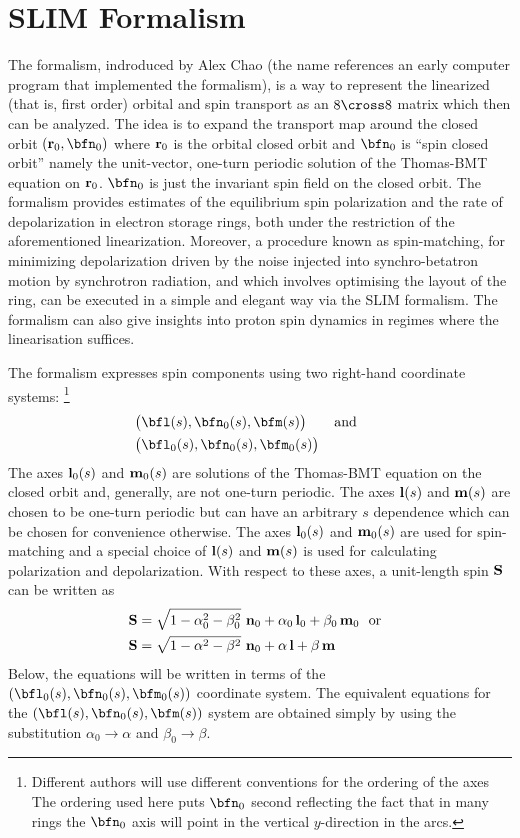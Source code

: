 {\section{SLIM Formalism}
\label{s:slim}

The  formalism\cite{b:chao.spin,b:barber99}, indroduced by Alex Chao (the name references
an early computer program that implemented the formalism), is a way to represent the linearized
(that is, first order) orbital and spin transport as an $8 \cross 8$ matrix which then can be
analyzed. The idea is to expand the transport map around the closed orbit $(\bfr_0, \bfn_0)$ where
${\bf r}_0$ is the orbital closed orbit and $\bfn_0$ is ``spin closed orbit'' namely the unit-vector,
one-turn periodic solution of the Thomas-BMT equation on ${\bf r}_0$. $\bfn_0$ is just the invariant
spin field on the closed orbit. The formalism provides estimates of the equilibrium spin
polarization and the rate of depolarization in electron storage rings, both under the restriction of
the aforementioned linearization. Moreover, a procedure known as spin-matching, for minimizing
depolarization driven by the noise injected into synchro-betatron motion by synchrotron radiation,
and which involves optimising the layout of the ring, can be executed in a simple and elegant way
via the SLIM formalism. The formalism can also give insights into proton spin dynamics in regimes
where the linearisation suffices.

The  formalism expresses spin components using two right-hand coordinate systems:
\footnote{Different authors will use different conventions for the ordering of the axes
The ordering used here puts $\bfn_0$ second reflecting the fact that in many rings the $\bfn_0$
axis will point in the vertical $y$-direction in the arcs.}
\begin{align}
  &\big( \bfl(s), \bfn_0(s), \bfm(s) \big) 
  \qquad \text{and} \qquad \CRNO
  &\big( \bfl_0(s), \bfn_0(s), \bfm_0(s) \big)
\end{align}
The axes ${\bf l}_0(s)$ and ${\bf m}_0(s)$ are solutions of the Thomas-BMT equation on the closed
orbit and, generally, are not one-turn periodic. The axes ${\bf l}(s)$ and ${\bf m}(s)$ are chosen
to be one-turn periodic but can have an arbitrary $s$ dependence which can be chosen for convenience
otherwise. The axes ${\bf l}_0(s)$ and ${\bf m}_0(s)$ are used for spin-matching and a special
choice of ${\bf l}(s)$ and ${\bf m}(s)$ is used for calculating polarization and depolarization.
With respect to these axes, a unit-length spin $\bf {{\bf S}}$ can be written as
\begin{align}
  \bf{S} &= \sqrt{1- \alpha_0^2 - \beta_0^2} ~{\bf n}_0 + \alpha_0 \, {\bf l}_0 + \beta_0 \, {\bf m}_0 
  ~~{\rm or }~~ \nonumber \\
  \bf{S} &= \sqrt{1- \alpha^2 - \beta^2} ~{\bf n}_0 + \alpha \, {\bf l} + \beta \, {\bf m}
  \label{s1ab}
\end{align}
Below, the equations will be written in terms of the $(\bfl_0(s), \bfn_0(s), \bfm_0(s))$ coordinate system.
The equivalent equations for the $(\bfl(s), \bfn_0(s), \bfm(s))$ system are obtained simply by using the
substitution $\alpha_0 \rightarrow \alpha$ and $\beta_0 \rightarrow \beta$.

}
